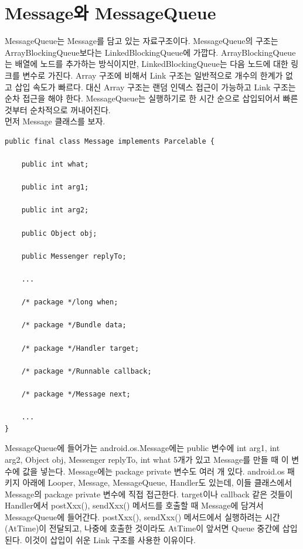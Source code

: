\section{Message와 MessageQueue}
\label{sec:messagequeue}
MessageQueue는 Message를 담고 있는 자료구조이다.
MessageQueue의 구조는 ArrayBlockingQueue보다는 LinkedBlockingQueue에 가깝다. ArrayBlockingQueue는 배열에 노드를 추가하는 방식이지만, LinkedBlockingQueue는 다음 노드에 대한 링크를 변수로 가진다. 
Array 구조에 비해서 Link 구조는 일반적으로 개수의 한계가 없고 삽입 속도가 빠르다. 
대신 Array 구조는 랜덤 인덱스 접근이 가능하고 Link 구조는 순차 접근을 해야 한다. MessageQueue는 실행하기로 한 시간 순으로 삽입되어서 빠른 것부터 순차적으로 꺼내어진다.\\

먼저 Message 클래스를 보자.
\begin{lstlisting}[frame=single, caption=Message.java] 
public final class Message implements Parcelable {

	public int what;

	public int arg1;

	public int arg2;

	public Object obj;

	public Messenger replyTo;
	
	...

	/* package */long when;

	/* package */Bundle data;

	/* package */Handler target;

	/* package */Runnable callback;

	/* package */Message next;
	
	...
}
\end{lstlisting}
MessageQueue에 들어가는 android.os.Message에는 public 변수에 int arg1, int arg2, Object obj,
Messenger replyTo, int what 5개가 있고 Message를 만들 때 이 변수에 값을 넣는다.
Message에는 package private 변수도 여러 개 있다. android.os 패키지 아래에 Looper, Message, MessageQueue, Handler도 있는데, 이들 클래스에서 Message의 package private 변수에 직접 접근한다. target이나 callback 같은 것들이 Handler에서 postXxx(), sendXxx() 메서드를 호출할 때 Message에 담겨서 MessageQueue에 들어간다. postXxx(), sendXxx() 메서드에서 실행하려는 시간(AtTime)이 전달되고, 나중에 호출한 것이라도 AtTime이 앞서면 Queue 중간에 삽입된다. 이것이 삽입이 쉬운 Link 구조를 사용한 이유이다.\\

